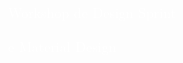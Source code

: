 \documentclass{article}
\begin{document}
	\color{textGray}
	\vspace*{105pt} %
	\Huge
	\BgThispage
		\textcolor{white}{Workshop de Design Sprint}

		\textcolor{white}{e Material Design}
	\BgThispage
	\vspace*{20pt}

	

	

	

	

	
\end{document}
